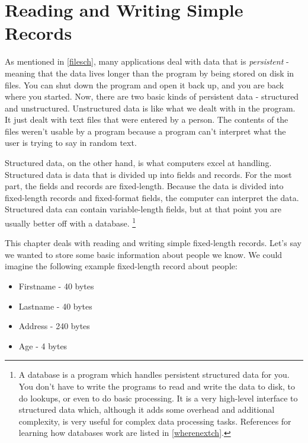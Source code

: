 \chapter{Reading and Writing Simple Records}
\label{records}


As mentioned in \autoref{filesch},
many applications deal with data that is \emph{persistent} - 
meaning that the data lives longer than the program by being stored on disk 
in files.  You can shut down the program and open it back up, and you are
back where you started.  Now, there are two basic kinds of persistent
data - structured and unstructured.  Unstructured data is like what we
dealt with in the  program.  It just dealt with text files that
were entered by a person.  The contents of the files weren't usable by
a program because a program can't interpret what the user is trying to
say in random text.

Structured data, on the other hand, is what computers excel at handling.
Structured data is data that is divided up into fields and records.  For the most
part, the fields and records are fixed-length.  Because the data is
divided into fixed-length records and fixed-format fields, the computer can interpret
the data.  Structured data can contain variable-length fields,
but at that point you are usually better off with a database.
\footnote{A database is a program which handles persistent structured data for you.
You don't have to write the programs to read and write the data to disk,
to do lookups, or even to do basic processing.  It is a very high-level
interface to structured data which, although it adds some overhead and
additional complexity, is very useful for complex data processing tasks.
References for learning how databases work are listed in \autoref{wherenextch}.
}

This chapter deals with reading and writing simple fixed-length records.
Let's say we wanted to store some basic information about people
we know.  We could imagine the following example fixed-length record about people:

\begin{itemize}\item Firstname - 40 bytes 
\item Lastname - 40 bytes 
\item Address - 240 bytes 
\item Age - 4 bytes 
\end{itemize}

